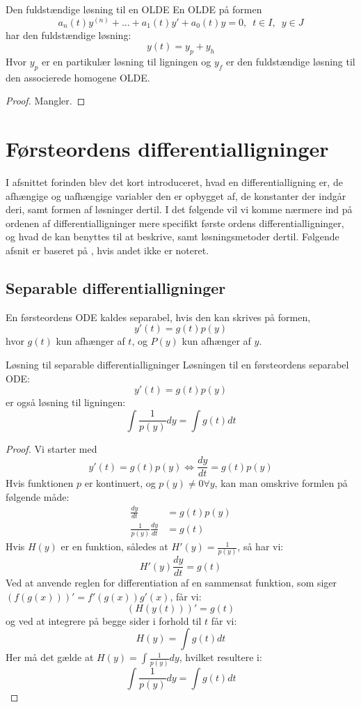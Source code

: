\begin{mytheo}{Den fuldstændige løsning til en OLDE}{}
En OLDE på formen 
$$a_n(t)y^{(n)}+\hdots +a_1(t)y'+a_0(t)y=0, \enspace t\in I, \enspace y\in J$$
har den fuldstændige løsning:
$$y(t)=y_p+y_h$$
Hvor $y_p$ er en partikulær løsning til ligningen og $y_f$ er den fuldstændige løsning til den associerede homogene OLDE.
\end{mytheo}
\begin{proof}\hfill \break
Mangler.
\end{proof}
\section{Førsteordens differentialligninger}
I afsnittet forinden blev det kort introduceret, hvad en differentialligning er, de afhængige og uafhængige variabler den er opbygget af, de konstanter der indgår deri, samt formen af løsninger dertil. I det følgende vil vi komme nærmere ind på ordenen af differentialligninger mere specifikt første ordens differentialligninger, og hvad de kan benyttes til at beskrive, samt løsningsmetoder dertil.
Følgende afsnit er baseret på \citep{JAB}, hvis andet ikke er noteret.
\subsection{Separable differentialligninger}

\begin{definition}
En førsteordens ODE kaldes separabel, hvis den kan skrives på formen, $$y'(t)=g(t)p(y)$$ hvor $g(t)$ kun afhænger af $t$, og $P(y)$ kun afhænger af $y$.
\end{definition}

\begin{mytheo}{Løsning til separable differentialligninger}{}
Løsningen til en førsteordens separabel ODE:
$$y'(t)=g(t)p(y)$$
er også løsning til ligningen: 
$$\int \frac{1}{p(y)}dy=\int g(t)dt$$
\end{mytheo}

\begin{proof}\hfill \break
Vi starter med $$y'(t)=g(t)p(y)\Longleftrightarrow \frac{dy}{dt} = g(t)p(y)$$
Hvis funktionen $p$ er kontinuert, og $p(y)\neq 0 \forall y$, kan man omskrive formlen på følgende måde:
\begin{align*}
    \frac{dy}{dt} &= g(t)p(y)\\
    \frac{1}{p(y)}\frac{dy}{dt} &= g(t)
\end{align*}
Hvis $H(y)$ er en funktion, således at $H'(y)=\frac{1}{p(y)}$, så har vi: $$H'(y) \frac{dy}{dt}=g(t)$$
Ved at anvende reglen for differentiation af en sammensat funktion, som siger $(f(g(x)))'=f'(g(x))g'(x)$, får vi:
$$(H(y(t)))'=g(t)$$
og ved at integrere på begge sider i forhold til $t$ får vi:
$$H(y)=\int g(t) dt$$
Her må det gælde at $H(y)=\int \frac{1}{p(y)}dy$, hvilket resultere i: $$\int \frac{1}{p(y)}dy=\int g(t) dt$$
\end{proof}

